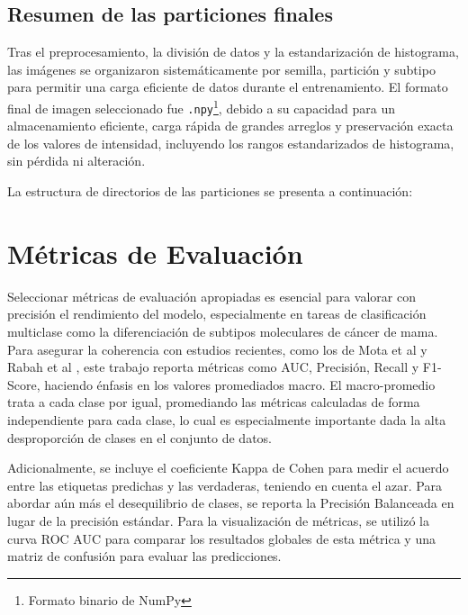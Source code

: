 \documentclass[a4paper,10pt]{book}
\begin{document}
\subsection{Resumen de las particiones finales}

Tras el preprocesamiento, la división de datos y la estandarización de histograma, las imágenes se organizaron sistemáticamente por semilla, partición y subtipo para permitir una carga eficiente de datos durante el entrenamiento. El formato final de imagen seleccionado fue \texttt{.npy}\footnote{Formato binario de NumPy}, debido a su capacidad para un almacenamiento eficiente, carga rápida de grandes arreglos y preservación exacta de los valores de intensidad, incluyendo los rangos estandarizados de histograma, sin pérdida ni alteración.

La estructura de directorios de las particiones se presenta a continuación:

\vspace{0.5cm}

\section{Métricas de Evaluación}

Seleccionar métricas de evaluación apropiadas es esencial para valorar con precisión el rendimiento del modelo, especialmente en tareas de clasificación multiclase como la diferenciación de subtipos moleculares de cáncer de mama. Para asegurar la coherencia con estudios recientes, como los de Mota et al \cite{mota_breast_2024} y Rabah et al \cite{ben_rabah_multimodal_2025}, este trabajo reporta métricas como AUC, Precisión, Recall y F1-Score, haciendo énfasis en los valores promediados macro. El macro-promedio trata a cada clase por igual, promediando las métricas calculadas de forma independiente para cada clase, lo cual es especialmente importante dada la alta desproporción de clases en el conjunto de datos.

Adicionalmente, se incluye el coeficiente Kappa de Cohen para medir el acuerdo entre las etiquetas predichas y las verdaderas, teniendo en cuenta el azar. Para abordar aún más el desequilibrio de clases, se reporta la Precisión Balanceada en lugar de la precisión estándar. Para la visualización de métricas, se utilizó la curva ROC AUC para comparar los resultados globales de esta métrica y una matriz de confusión \cite{noauthor_que_nodate} para evaluar las predicciones.
\end{document}
